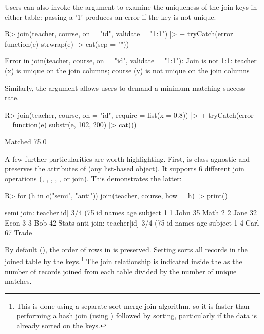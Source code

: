 \documentclass[nojss]{jss} %
\newcommand{\fct}[1]{\code{#1()}}
\begin{document}
Users can also invoke the  argument to examine the uniqueness of the join keys in either table: passing a '1' produces an error if the key is not unique.
%
\begin{Schunk}
\begin{Sinput}
R> join(teacher, course, on = "id", validate = "1:1") |>
+    tryCatch(error = function(e) strwrap(e) |> cat(sep = "\n"))
\end{Sinput}
\begin{Soutput}
Error in join(teacher, course, on = "id", validate = "1:1"): Join is
not 1:1: teacher (x) is unique on the join columns; course (y) is
not unique on the join columns
\end{Soutput}
\end{Schunk}
%
Similarly, the  argument allows users to demand a minimum matching success rate.
%
\begin{Schunk}
\begin{Sinput}
R> join(teacher, course, on = "id", require = list(x = 0.8)) |>
+    tryCatch(error = function(e) substr(e, 102, 200) |> cat())
\end{Sinput}
\begin{Soutput}
Matched 75.0% of records in table teacher (x), but 80.0% is required
\end{Soutput}
\end{Schunk}
%
A few further particularities are worth highlighting. First, \fct{join} is class-agnostic and preserves the attributes of  (any list-based object). It supports 6 different join operations (, , , , , or  join). This demonstrates the latter:
\begin{Schunk}
\begin{Sinput}
R> for (h in c("semi", "anti")) join(teacher, course, how = h) |> print()
\end{Sinput}
\begin{Soutput}
semi join: teacher[id] 3/4 (75%) <1:1st> course[id] 3/5 (60%)
  id names age subject
1  1  John  35    Math
2  2  Jane  32    Econ
3  3   Bob  42   Stats
anti join: teacher[id] 3/4 (75%) <1:1st> course[id] 3/5 (60%)
  id names age subject
1  4  Carl  67   Trade
\end{Soutput}
\end{Schunk}
By default (), the order of rows in  is preserved. Setting  sorts all records in the joined table by the keys.\footnote{This is done using a separate sort-merge-join algorithm, so it is faster than performing a hash join (using \fct{fmatch}) followed by sorting, particularly if the data is already sorted on the keys. } The join relationship is indicated inside the \code{<>} as the number of records joined from each table divided by the number of unique matches. %
\end{document}
